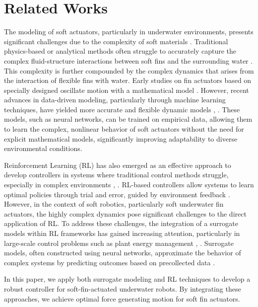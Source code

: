 \section{Related Works}
The modeling of soft actuators, particularly in underwater environments, presents significant challenges due to the complexity of soft materials \cite{muhammad2014non}. Traditional physics-based or analytical methods often struggle to accurately capture the complex fluid-structure interactions between soft fins and the surrounding water \cite{singh2019dynamic}. This complexity is further compounded by the complex dynamics that arises from the interaction of flexible fins with water. Early studies on fin actuators based on specially designed oscillate motion with a mathematical model \cite{gkliva2018development}. However, recent advances in data-driven modeling, particularly through machine learning techniques, have yielded more accurate and flexible dynamic models \cite{lee2023data}, \cite{9652036}. These models, such as neural networks, can be trained on empirical data, allowing them to learn the complex, nonlinear behavior of soft actuators without the need for explicit mathematical models, significantly improving adaptability to diverse environmental conditions.

Reinforcement Learning (RL) has also emerged as an effective approach to develop controllers in systems where traditional control methods struggle, especially in complex environments \cite{tong2023survey}, \cite{6315769}. RL-based controllers allow systems to learn optimal policies through trial and error, guided by environment feedback \cite{singh2022reinforcement}. However, in the context of soft robotics, particularly soft underwater fin actuators, the highly complex dynamics pose significant challenges to the direct application of RL. To address these challenges, the integration of a surrogate models within RL frameworks has gained increasing attention, particularly in large-scale control problems such as plant energy management \cite{pinto2021data}, \cite{wang2021surrogate}. Surrogate models, often constructed using neural networks, approximate the behavior of complex systems by predicting outcomes based on precollected data \cite{hou2022dimensionality}. 

In this paper, we apply both surrogate modeling and RL techniques to develop a robust controller for soft-fin-actuated underwater robots. By integrating these approaches, we achieve optimal force generating motion for soft fin actuators.